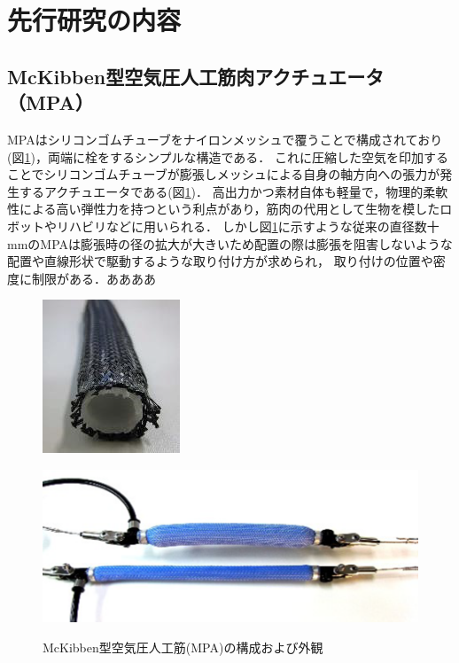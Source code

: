 \newpage
\section{先行研究の内容}
\subsection{McKibben型空気圧人工筋肉アクチュエータ（MPA）}
MPAはシリコンゴムチューブをナイロンメッシュで覆うことで構成されており(図\ref{fig:MPA})，両端に栓をするシンプルな構造である．
これに圧縮した空気を印加することでシリコンゴムチューブが膨張しメッシュによる自身の軸方向への張力が発生するアクチュエータである(図\ref{fig:MPA})．
高出力かつ素材自体も軽量で，物理的柔軟性による高い弾性力を持つという利点があり，筋肉の代用として生物を模したロボットやリハビリなどに用いられる．
しかし図\ref{fig:MPA}に示すような従来の直径数十 mmのMPAは膨張時の径の拡大が大きいため配置の際は膨張を阻害しないような配置や直線形状で駆動するような取り付け方が求められ，
取り付けの位置や密度に制限がある．ああああ
\begin{figure}[b]
  \begin{minipage}{0.49\columnwidth}
    \vspace{4mm}
    \centering
    \includegraphics[scale=1]{image/MPA_kousei.png}
    \vspace{3mm}
    \label{fig:Structure}
  \end{minipage}
  \begin{minipage}{0.49\columnwidth}
    \vspace{25mm}
    \centering
    \includegraphics[scale=.8]{image/MPA_dousa.png}
    \label{fig:move}
  \end{minipage}
  \caption{McKibben型空気圧人工筋(MPA)の構成および外観\cite{中西大輔2020}}
  \label{fig:MPA}
\end{figure}
